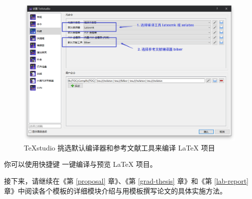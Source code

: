 \begin{figure}[H]
  \centering
  \includegraphics[width=\textwidth]{images/texstudio_build.png}
  \caption{\TeX studio 挑选默认编译器和参考文献工具来编译 {\LaTeX} 项目}
\end{figure}

你可以使用快捷键  一键编译与预览 {\LaTeX} 项目。

接下来，请继续在《第 \ref{proposal} 章》、《第 \ref{grad-thesis} 章》和《第 \ref{lab-report} 章》中阅读各个模板的详细模块介绍与用模板撰写论文的具体实施方法。
